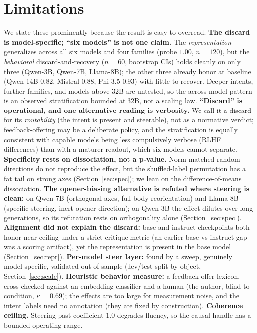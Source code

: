 \documentclass[11pt]{article}
\begin{document}
\section{Limitations}
We state these prominently because the result is easy to overread. \textbf{The discard is model-specific;
``six models'' is not one claim.} The \emph{representation} generalizes across all six models and four families
(probe $1.00$, $n{=}120$), but the \emph{behavioral} discard-and-recovery ($n{=}60$, bootstrap CIs) holds
cleanly on only three (Qwen-3B, Qwen-7B, Llama-8B); the other three already honor at baseline (Qwen-14B $0.82$,
Mistral $0.88$, Phi-3.5 $0.93$) with little to recover. Deeper intents, further families, and models above 32B
are untested, so the across-model pattern is an observed stratification bounded at 32B, not a scaling law.
\textbf{``Discard'' is operational, and one alternative reading is verbosity.} We call it a discard for its
\emph{routability} (the intent is present and steerable), not as a normative verdict; feedback-offering may be
a deliberate policy, and the stratification is equally consistent with capable models being less compulsively
verbose (RLHF differences) than with a maturer readout, which six models cannot separate.
\textbf{Specificity rests on dissociation, not a p-value.} Norm-matched random directions do not reproduce the
effect, but the shuffled-label permutation has a fat tail on strong axes (Section~\ref{sec:spec}); we lean on
the difference-of-means dissociation. \textbf{The opener-biasing alternative is refuted where steering is clean:}
on Qwen-7B (orthogonal axes, full body reorientation) and Llama-8B (specific steering, inert opener direction);
on Qwen-3B the effect dilutes over long generations, so its refutation rests on orthogonality alone
(Section~\ref{sec:spec}).
\textbf{Alignment did not explain the discard:} base and instruct checkpoints both honor near ceiling under a
strict critique metric (an earlier base-vs-instruct gap was a scoring artifact), yet the representation is
present in the base model (Section~\ref{sec:repr}). \textbf{Per-model steer layer:} found by a sweep, genuinely
model-specific, validated out of sample (dev/test split by object, Section~\ref{sec:scale}). \textbf{Heuristic
behavior measure:} a feedback-offer lexicon, cross-checked against an embedding classifier and a human (the
author, blind to condition, $\kappa{=}0.69$); the effects are too large for measurement noise, and the intent
labels need no annotation (they are fixed by construction). \textbf{Coherence ceiling.} Steering past coefficient $1.0$ degrades
fluency, so the causal handle has a bounded operating range.
\end{document}
